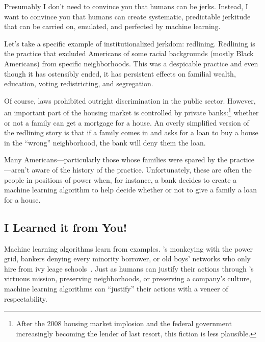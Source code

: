 

Presumably I don't need to convince you that humans can be jerks.
Instead, I want to convince you that humans can create systematic,
predictable jerkitude that can be carried on, emulated, and perfected
by machine learning.

Let's take a specific example of institutionalized jerkdom: redlining.
Redlining is the practice that excluded Americans of some racial
backgrounds (mostly Black Americans) from specific neighborhoods.
This was a despicable practice and even though it has ostensibly
ended, it has persistent effects on familial wealth, education, voting
redistricting, and segregation.

Of course, laws prohibited outright discrimination in the public
sector.  However, an important part of the housing market is
controlled by private banks:\footnote{After the 2008 housing market
  implosion and the federal government increasingly becoming the
  lender of last resort, this fiction is less plausible.} whether or
not a family can get a mortgage for a house.  An overly simplified
version of the redlining story is that if a family comes in and asks
for a loan to buy a house in the ``wrong'' neighborhood, the bank will
deny them the loan.

Many Americans---particularly those whose families were spared by the
practice---aren't aware of the history of the practice.
Unfortunately, these are often the people in positions of power when,
for instance, a bank decides to create a machine learning algorithm to
help decide whether or not to give a family a loan for a house.

\subsection{I Learned it from You!}

Machine learning algorithms learn from examples.  \energyJerk{}'s
monkeying with the power grid, bankers denying every minority
borrower, or old boys' networks who only hire from ivy leage
schools~\cite{}.  Just as humans can justify their actions through
\energyCompany{}'s virtuous mission, preserving neighborhoods, or
preserving a company's culture, machine learning algorithms can
``justify'' their actions with a veneer of respectability.

